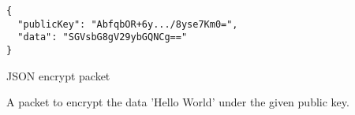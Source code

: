 \begin{listing}[H]
  \centering
  \begin{verbatim}
{
  "publicKey": "AbfqbOR+6y.../8yse7Km0=",
  "data": "SGVsbG8gV29ybGQNCg=="
}
  \end{verbatim}
  \caption{
  	JSON encrypt packet
  }{
  	A packet to encrypt the data 'Hello World' under the given public key.
  }
  \label{code:encrypt_data_json}
\end{listing}
